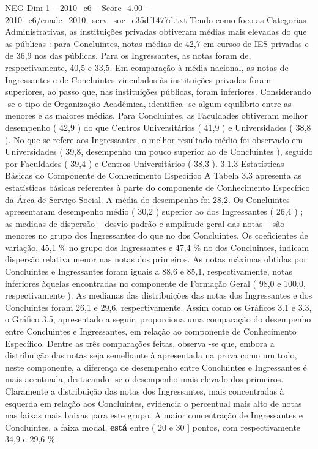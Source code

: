 \begin{textsample}{NEG Dim 1 – 2010\_c6 – Score -4.00 – 2010\_c6/enade\_2010\_serv\_soc\_e35df1477d.txt}
Tendo como foco as Categorias Administrativas, as instituições privadas obtiveram médias mais elevadas do que as públicas : para Concluintes, notas médias de 42,7 em cursos de IES privadas e de 36,9 nos das públicas.
Para os Ingressantes, as notas foram de, respectivamente, 40,5 e 33,5.
Em comparação à média nacional, as notas de Ingressantes e de Concluintes vinculados às instituições privadas foram superiores, ao passo que, nas instituições públicas, foram inferiores.
Considerando -se o tipo de Organização Acadêmica, identifica -se algum equilíbrio entre as menores e as maiores médias.
Para Concluintes, as Faculdades obtiveram melhor desempenho ( 42,9 ) do que Centros Universitários ( 41,9 ) e Universidades ( 38,8 ).
No que se refere aos Ingressantes, o melhor resultado médio foi observado em Universidades ( 39,8, desempenho um pouco superior ao de Concluintes ), seguido por Faculdades ( 39,4 ) e Centros Universitários ( 38,3 ). 3.1.3 Estatísticas Básicas do Componente de Conhecimento Específico A Tabela 3.3 apresenta as estatísticas básicas referentes à parte do componente de Conhecimento Específico da Área de Serviço Social.
A média do desempenho foi 28,2.
Os Concluintes apresentaram desempenho médio ( 30,2 ) superior ao dos Ingressantes ( 26,4 ) ; as medidas de dispersão – desvio padrão e amplitude geral das notas – são menores no grupo dos Ingressantes do que no dos Concluintes.
Os coeficientes de variação, 45,1 \% no grupo dos Ingressantes e 47,4 \% no dos Concluintes, indicam dispersão relativa menor nas notas dos primeiros.
As notas máximas obtidas por Concluintes e Ingressantes foram iguais a 88,6 e 85,1, respectivamente, notas inferiores àquelas encontradas no componente de Formação Geral ( 98,0 e 100,0, respectivamente ).
As medianas das distribuições das notas dos Ingressantes e dos Concluintes foram 26,1 e 29,6, respectivamente.
Assim como os Gráficos 3.1 e 3.3, o Gráfico 3.5, apresentado a seguir, proporciona uma comparação do desempenho entre Concluintes e Ingressantes, em relação ao componente de Conhecimento Específico.
Dentre as três comparações feitas, observa -se que, embora a distribuição das notas seja semelhante à apresentada na prova como um todo, neste componente, a diferença de desempenho entre Concluintes e Ingressantes é mais acentuada, destacando -se o desempenho mais elevado dos primeiros.
Claramente a distribuição das notas dos Ingressantes, mais concentradas à esquerda em relação aos Concluintes, evidencia o percentual mais alto de notas nas faixas mais baixas para este grupo.
A maior concentração de Ingressantes e Concluintes, a faixa modal, \textbf{está} entre ( 20 e 30 ] pontos, com respectivamente 34,9 e 29,6 \%.

\end{textsample}
